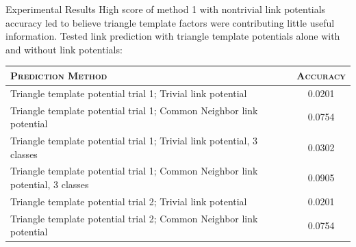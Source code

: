 \documentclass[final,t]{beamer}
\begin{document}
\begin{frame}{}
\begin{columns}[t]
\begin{column}{.3\linewidth}
\begin{block}{Experimental Results}
High score of  method 1 with nontrivial link potentials accuracy led to believe \alert{triangle template
factors were contributing little useful information}.
\break
\break
Tested link prediction with triangle template potentials alone with
and without link potentials:
\break
\begin{center}
\begin{tabular}{l|c}
\hline
\textsc{Prediction Method} & \textsc{Accuracy} \\
\hline
\hline
Triangle template potential trial 1; Trivial link potential & 0.0201
\\
Triangle template potential trial 1; Common Neighbor link potential & 0.0754                    %
\\
Triangle template potential trial 1; Trivial link potential, 3 classes & 0.0302                                                  %
\\
Triangle template potential trial 1; Common Neighbor link potential, 3 classes & 0.0905     %
\\
Triangle template potential trial 2; Trivial link potential & 0.0201
\\
Triangle template potential trial 2; Common Neighbor link potential & 0.0754
\\
\hline
\end{tabular}
\end{center}

\break
      \end{block}
                
\end{column}
\end{columns}
\end{frame}
\end{document}
